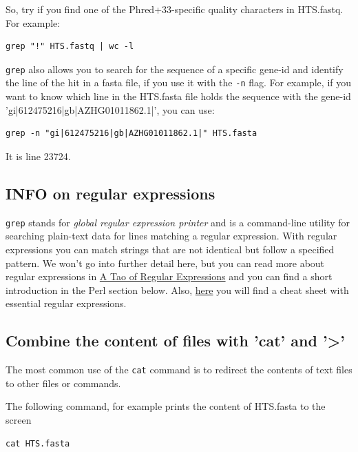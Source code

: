 \documentclass[11pt]{article}
\begin{document}
So, try if you find one of the Phred+33-specific quality characters in
HTS.fastq. For example:

\begin{verbatim}
grep "!" HTS.fastq | wc -l
\end{verbatim}



\texttt{grep} also allows you to search for the sequence of a specific
gene-id and identify the line of the hit in a fasta file, if you use
it with the \texttt{-n} flag. For example, if you want to know which line
in the HTS.fasta file holds the sequence with the gene-id
'gi|612475216|gb|AZHG01011862.1|', you can use:

\begin{verbatim}
grep -n "gi|612475216|gb|AZHG01011862.1|" HTS.fasta
\end{verbatim}

It is line 23724.

\subsection{INFO on regular expressions}
\label{sec-4-3}

\texttt{grep} stands for \emph{global regular expression printer} and is a
command-line utility for searching plain-text data for lines matching
a regular expression. With regular expressions you can match strings
that are not identical but follow a specified pattern.  We won't
go into further detail here, but you can read more about regular
expressions in \href{http://www.scootersoftware.com/RegEx.html}{A Tao of Regular Expressions} and you can find a 
short introduction in the Perl section below. Also, \href{http://www.cheatography.com/davechild/cheat-sheets/regular-expressions/}{here} you will find
a cheat sheet with essential regular expressions.

\subsection{Combine the content of files with 'cat' and '>'}
\label{sec-4-4}
The most common use of the \texttt{cat} command is to redirect the contents of
text files to other files or commands.

The following command, for example prints the content of HTS.fasta to the screen

\begin{verbatim}
cat HTS.fasta
\end{verbatim}
\end{document}
